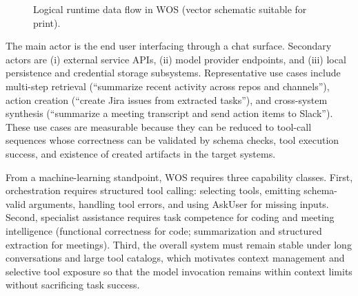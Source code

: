\documentclass[conference]{IEEEtran}
\begin{document}
\begin{figure}[!t]
\centering
{}
\caption{Logical runtime data flow in WOS (vector schematic suitable for print).}
\label{fig:wos_logical_tikz}
\end{figure}

The main actor is the end user interfacing through a chat surface. Secondary actors are (i) external service APIs, (ii) model provider endpoints, and (iii) local persistence and credential storage subsystems. Representative use cases include multi-step retrieval (“summarize recent activity across repos and channels”), action creation (“create Jira issues from extracted tasks”), and cross-system synthesis (“summarize a meeting transcript and send action items to Slack”). These use cases are measurable because they can be reduced to tool-call sequences whose correctness can be validated by schema checks, tool execution success, and existence of created artifacts in the target systems.

From a machine-learning standpoint, WOS requires three capability classes. First, orchestration requires structured tool calling: selecting tools, emitting schema-valid arguments, handling tool errors, and using AskUser for missing inputs. Second, specialist assistance requires task competence for coding and meeting intelligence (functional correctness for code; summarization and structured extraction for meetings). Third, the overall system must remain stable under long conversations and large tool catalogs, which motivates context management and selective tool exposure so that the model invocation remains within context limits without sacrificing task success.
\end{document}
